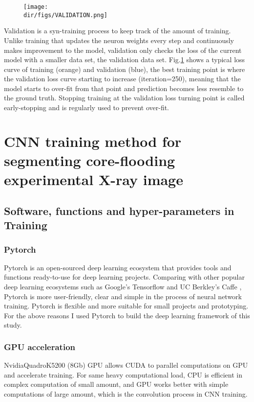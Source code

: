\begin{figure}[htbp]
  \centering
  \texttt{[image: \\dir/figs/VALIDATION.png]}
  \caption{}
  \label{validation}
\end{figure}

Validation is a syn-training process to keep track of the amount of training. Unlike training that updates the neuron weights every step and continuously makes improvement to the model, validation only checks the loss of the current model with a smaller data set, the validation data set. Fig.\ref{validation} shows a typical loss curve of training (orange) and validation (blue), the best training point is where the validation loss curve starting to increase (iteration=250), meaning that the model starts to over-fit from that point and prediction becomes less resemble to the ground truth. Stopping training at the validation loss turning point is called early-stopping and is regularly used to prevent over-fit.

\section{CNN training method for segmenting core-flooding experimental X-ray image}
\subsection{Software, functions and hyper-parameters in Training}
\subsubsection{Pytorch}
Pytorch \citep{paszke2017automatic} is an open-sourced deep learning ecosystem that provides tools and functions ready-to-use for deep learning projects. Comparing with other popular deep learning ecosystems such as Google's Tensorflow \citep{tensorflow2015-whitepaper} and UC Berkley's Caffe \citep{jia2014caffe}, Pytorch is more user-friendly, clear and simple in the process of neural network training. Pytorch is flexible and more suitable for small projects and prototyping. For the above reasons I used Pytorch to build the deep learning framework of this study.

\subsubsection{GPU acceleration}
Nvidia\texttrademark QuadroK5200 (8Gb) GPU allows CUDA \citep{cook2012cuda} to parallel computations on GPU and accelerate training. For same heavy computational load, CPU is efficient in complex computation of small amount, and GPU works better with simple computations of large amount, which is the convolution process in CNN training.

